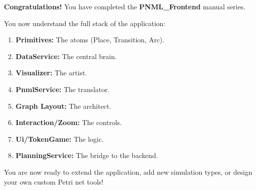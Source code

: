 \documentclass[a4paper,11pt,oneside]{report}
\begin{document}
\textbf{Congratulations!} You have completed the \textbf{PNML\_Frontend} manual series.

You now understand the full stack of the application:
\begin{enumerate}
    \item \textbf{Primitives:} The atoms (Place, Transition, Arc).
    \item \textbf{DataService:} The central brain.
    \item \textbf{Visualizer:} The artist.
    \item \textbf{PnmlService:} The translator.
    \item \textbf{Graph Layout:} The architect.
    \item \textbf{Interaction/Zoom:} The controls.
    \item \textbf{Ui/TokenGame:} The logic.
    \item \textbf{PlanningService:} The bridge to the backend.
\end{enumerate}

You are now ready to extend the application, add new simulation types, or design your own custom Petri net tools!
\end{document}
